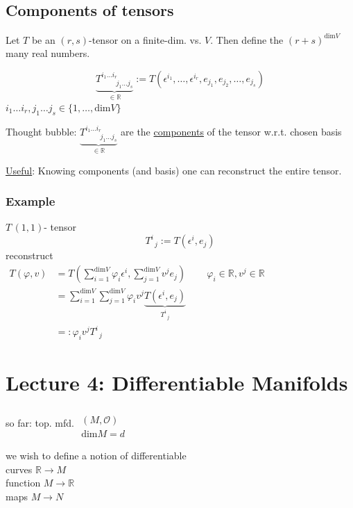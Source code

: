 \documentclass[10pt]{amsart}
\begin{document}
\begin{multicols*}{2}
\subsection{Components of tensors}

Let $T$ be an $(r,s)$-tensor on a finite-dim. vs. $V$.  Then define the $(r+s)^{\text{dim}V}$ many real numbers.  

\[
\underbrace{T^{i_1 \dots i_r}_{ \qquad \, j_1 \dots j_s} }_{\in \mathbb{R}} := T(\epsilon^{i_1}, \dots , \epsilon^{i_r} , e_{j_1} , e_{j_2}, \dots, e_{j_s} )
\]
$i_1 \dots i_r, j_1 \dots j_s \in \lbrace 1 , \dots , \text{dim}V \rbrace$

Thought bubble: $\underbrace{T^{i_1 \dots i_r}_{ \qquad \, j_1 \dots j_s} }_{\in \mathbb{R}}$ are the \underline{components} of the tensor w.r.t. chosen basis

\underline{Useful}: Knowing components (and basis) one can reconstruct the entire tensor.

\subsubsection*{Example} $T \, (1,1)$- tensor
\[
T^i_{ \; \; j} := T(\epsilon^i, e_j)
\]
reconstruct \\
$\begin{aligned} 
T(\varphi,v) & =T(\sum_{i=1}^{\text{dim}{V}}\varphi_i \epsilon^i, \sum_{j=1}^{\text{dim}V} v^j e_j)   \qquad \, \varphi_i \in \mathbb{R}, v^j \in \mathbb{R} \\ 
&  = \sum_{i=1}^{\text{dim}V} \sum_{j=1}^{\text{dim}{V}} \varphi_i v^j \underbrace{ T(\epsilon^i, e_j) }_{T^i_{ \; \; j}} \\
& =: \varphi_i v^j T^i_{ \; \; j}
\end{aligned}$







\section{Lecture 4: Differentiable Manifolds}

so far: top. mfd. $\begin{gathered}  \quad \\ 
(M,\mathcal{O}) \\
\text{dim}M = d \end{gathered}$

we wish to define a notion of differentiable  \\
\phantom{ \quad \quad \, } curves $\mathbb{R} \to M$ \\
\phantom{ \quad \quad \, } function $M \to \mathbb{R}$ \\
\phantom{ \quad \quad \, } maps $M \to N$


\end{multicols*}
\end{document}
